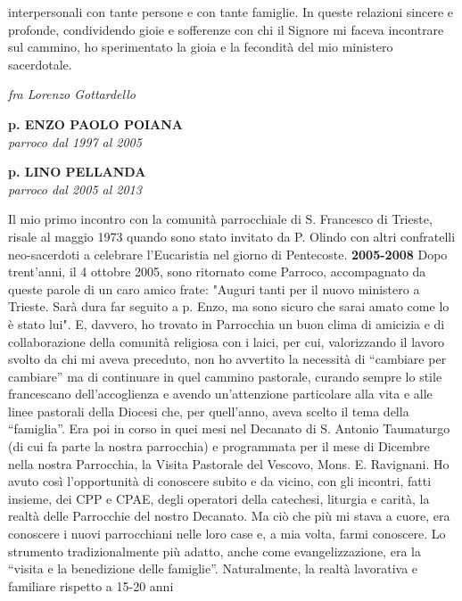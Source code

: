 interpersonali con tante persone e con tante famiglie. In queste relazioni sincere e profonde, 
condividendo gioie e sofferenze con chi il Signore mi faceva incontrare sul cammino, ho 
sperimentato la gioia e la fecondità del mio ministero sacerdotale. 
\begin{flushright}
\textit{fra Lorenzo Gottardello}
\end{flushright}
\bigskip
\begin{center}
\textbf{\Large p. ENZO PAOLO POIANA}\\
	\textit{parroco dal 1997 al 2005}
\end{center}
\bigskip
\begin{center}
\textbf{\Large p. LINO PELLANDA}\\
	\textit{parroco dal 2005 al 2013}
\end{center}
\bigbreak
Il mio primo incontro con la comunità parrocchiale di S. Francesco di Trieste, risale al 
maggio 1973 quando sono stato invitato da P. Olindo con altri confratelli neo-sacerdoti a celebrare 
l'Eucaristia nel giorno di Pentecoste.
\bigbreak
\textbf{2005-2008}
\medbreak
Dopo trent'anni, il 4 ottobre 2005, sono ritornato come Parroco, accompagnato da queste 
parole di un caro amico frate: "Auguri tanti per il nuovo ministero a Trieste. Sarà dura far seguito a 
p. Enzo, ma sono sicuro che sarai amato come lo è stato lui".
E, davvero, ho trovato in Parrocchia un buon clima di amicizia e di collaborazione della comunità 
religiosa con i laici, per cui, valorizzando il lavoro svolto da chi mi aveva preceduto, non ho 
avvertito la necessità di “cambiare per cambiare” ma di continuare in quel cammino pastorale, 
curando sempre lo stile francescano dell'accoglienza e avendo un'attenzione particolare alla vita e 
alle linee pastorali della Diocesi che, per quell'anno, aveva scelto il tema della “famiglia”.
Era poi in corso in quei mesi nel Decanato di S. Antonio Taumaturgo (di cui fa parte la nostra 
parrocchia) e programmata per il mese di Dicembre nella nostra Parrocchia, la Visita Pastorale del 
Vescovo, Mons. E. Ravignani.
Ho avuto così l'opportunità di conoscere subito e da vicino, con gli incontri, fatti insieme, dei CPP e 
CPAE, degli operatori della catechesi, liturgia e carità, la realtà delle Parrocchie del nostro 
Decanato. Ma ciò che più mi stava a cuore, era conoscere i nuovi parrocchiani nelle loro case e, a 
mia volta, farmi conoscere.
Lo strumento tradizionalmente più adatto, anche come evangelizzazione, era la “visita e la 
benedizione delle famiglie”. Naturalmente, la realtà lavorativa e familiare rispetto a 15-20 anni 
